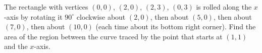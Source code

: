 The rectangle with vertices $(0,0)$, $(2,0)$, $(2,3)$, $(0,3)$ is rolled along the $x$-axis by rotating it $90^\circ$ clockwise about $(2,0)$, then about $(5,0)$, then about $(7,0)$, then about $(10,0)$ (each time about its bottom right corner). Find the area of the region between the curve traced by the point that starts at $(1,1)$ and the $x$-axis.
